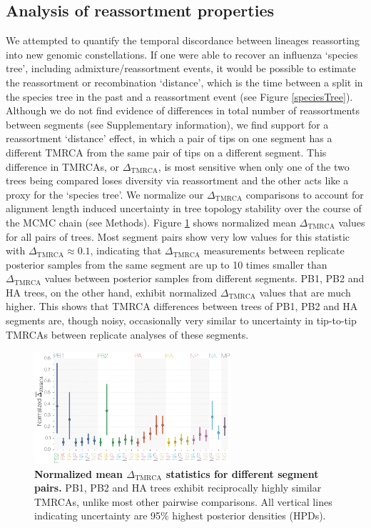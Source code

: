 \documentclass[11pt,oneside,letterpaper]{article}
\newcommand{\dtmrca}{\Delta_\mathrm{TMRCA}}
\begin{document}
\subsection*{Analysis of reassortment properties}
We attempted to quantify the temporal discordance between lineages reassorting into new genomic constellations.
If one were able to recover an influenza `species tree', including admixture/reassortment events, it would be possible to estimate the reassortment or recombination `distance', which is the time between a split in the species tree in the past and a reassortment event (see Figure \ref{speciesTree}).
Although we do not find evidence of differences in total number of reassortments between segments (see Supplementary information), we find support for a reassortment `distance' effect, in which a pair of tips on one segment has a different TMRCA from the same pair of tips on a different segment.
This difference in TMRCAs, or $\dtmrca$, is most sensitive when only one of the two trees being compared loses diversity via reassortment and the other acts like a proxy for the `species tree'.
We normalize our $\dtmrca$ comparisons to account for alignment length induced uncertainty in tree topology stability over the course of the MCMC chain (see Methods).
Figure \ref{deltaTMRCA} shows normalized mean $\dtmrca$ values for all pairs of trees.
Most segment pairs show very low values for this statistic with $\dtmrca \approx 0.1$, indicating that $\dtmrca$ measurements between replicate posterior samples from the same segment are up to 10 times smaller than $\dtmrca$ values between posterior samples from different segments.
PB1, PB2 and HA trees, on the other hand, exhibit normalized $\dtmrca$ values that are much higher.
This shows that TMRCA differences between trees of PB1, PB2 and HA segments are, though noisy, occasionally very similar to uncertainty in tip-to-tip TMRCAs between replicate analyses of these segments.

\begin{figure}[h]
	\centering
	\includegraphics[width=0.65\textwidth]{figures/InfB_normalizedMuDeltaTMRCA.png}
	\caption{\textbf{Normalized mean $\dtmrca$ statistics for different segment pairs.}
PB1, PB2 and HA trees exhibit reciprocally highly similar TMRCAs, unlike most other pairwise comparisons.
All vertical lines indicating uncertainty are 95\% highest posterior densities (HPDs).}
	\label{deltaTMRCA}
\end{figure}
\end{document}
